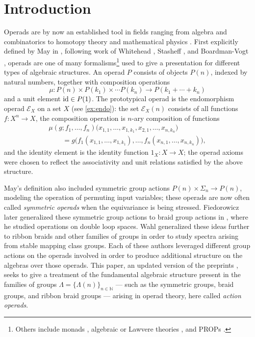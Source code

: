 \section{Introduction}

Operads are by now an established tool in fields ranging from algebra \cite{loday-vallette} and combinatorics \cite{mendez} to homotopy theory \cite{fie-br} and mathematical physics \cite{mss-op}.
First explicitly defined by May in \cite{maygeom}, following work of Whitehead \cite{whitehead}, Stasheff \cite{stasheff}, and Boardman-Vogt \cite{bv}, operads are one of many formalisms\footnote{Others include monads \cite{et-monads}, algebraic or Lawvere theories \cite{lawvere-thesis}, and PROPs \cite{mac_prop}.} used to give a presentation for different types of algebraic structures.
An operad $P$ consists of objects $P(n)$, indexed by natural numbers, together with composition operations
\[
\mu \colon P(n) \times P(k_1) \times \cdots P(k_n) \to P(k_1 + \cdots + k_n)
\]
and a unit element $\textrm{id} \in P(1)$.
The prototypical operad is the endomorphism operad $\mathcal{E}_X$ on a set $X$ (see \cref{ex:endo}): the set $\mathcal{E}_X(n)$ consists of all functions $f \colon X^n \to X$, the composition operation is $n$-ary composition of functions
\begin{align*}
\mu(g; f_1, \ldots, f_n)\big(x_{1,1}, \ldots, x_{1, k_1}, x_{2,1}, \ldots, x_{n, k_n}\big) \qquad \\ \qquad = g \Big( f_1(x_{1,1}, \ldots, x_{1,k_1}), \ldots, f_n(x_{n,1}, \ldots, x_{n, k_n}) \Big),
\end{align*}
and the identity element is the identity function $1_X \colon X \to X$; the operad axioms were chosen to reflect the associativity and unit relations satisfied by the above structure.

May's definition also included symmetric group actions $P(n) \times \Sigma_n \to P(n)$, modeling the operation of permuting input variables; these operads are now often called \emph{symmetric operads} when the equivariance is being stressed.
Fiedorowicz later generalized these symmetric group actions to braid group actions in \cite{fie-br}, where he studied operations on double loop spaces. 
Wahl \cite{wahl-thesis} generalized these ideas further to ribbon braids and other families of groups in order to study spectra arising from stable mapping class groups.
Each of these authors leveraged different group actions on the operads involved in order to produce additional structure on the algebras over those operads.
This paper, an updated version of the preprints \cite{cg-preprint,g-borel}, seeks to give a treatment of the fundamental algebraic structure present in the families of groups $\Lambda = \{ \Lambda(n) \}_{n \in \mathbb{N}}$ --- such as the symmetric groups, braid groups, and ribbon braid groups --- arising in operad theory, here called \emph{action operads}.

